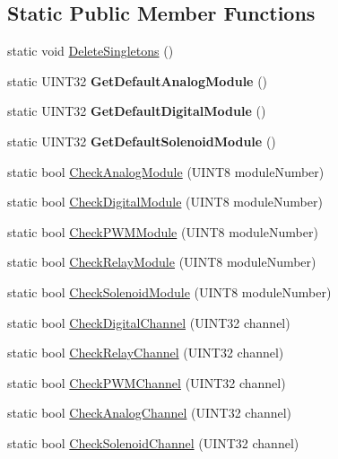 \subsection*{Static Public Member Functions}
\begin{DoxyCompactItemize}
\item 
static void \hyperlink{classSensorBase_aac521c8617e84c41c3e7c921302cdcc6}{DeleteSingletons} ()
\item 
\hypertarget{classSensorBase_ac4b2b62295f1b7e43124c63340c2957b}{
static UINT32 {\bfseries GetDefaultAnalogModule} ()}
\label{classSensorBase_ac4b2b62295f1b7e43124c63340c2957b}

\item 
\hypertarget{classSensorBase_a58b76ce72e9d70bf88b613b9f979a555}{
static UINT32 {\bfseries GetDefaultDigitalModule} ()}
\label{classSensorBase_a58b76ce72e9d70bf88b613b9f979a555}

\item 
\hypertarget{classSensorBase_a75c14f39c43663aca647876cece69fa0}{
static UINT32 {\bfseries GetDefaultSolenoidModule} ()}
\label{classSensorBase_a75c14f39c43663aca647876cece69fa0}

\item 
static bool \hyperlink{classSensorBase_a010ca97e0517a7dcaaf81b3d60c7c409}{CheckAnalogModule} (UINT8 moduleNumber)
\item 
static bool \hyperlink{classSensorBase_a4a80dc8b3693bb5720f03f06e05cd0bc}{CheckDigitalModule} (UINT8 moduleNumber)
\item 
static bool \hyperlink{classSensorBase_a273815e624f63a1ec6817a6b734832b5}{CheckPWMModule} (UINT8 moduleNumber)
\item 
static bool \hyperlink{classSensorBase_aa720a37953f69dd8a742e3707cbbb8ac}{CheckRelayModule} (UINT8 moduleNumber)
\item 
static bool \hyperlink{classSensorBase_a93b945da6cc5fc0e8eca68bf2749ff65}{CheckSolenoidModule} (UINT8 moduleNumber)
\item 
static bool \hyperlink{classSensorBase_a6b38ec81d351403492b0449dd4615e12}{CheckDigitalChannel} (UINT32 channel)
\item 
static bool \hyperlink{classSensorBase_af83a99ec4a84a9265a5a077d200c6275}{CheckRelayChannel} (UINT32 channel)
\item 
static bool \hyperlink{classSensorBase_ac4319058432968761cd72470b82644ae}{CheckPWMChannel} (UINT32 channel)
\item 
static bool \hyperlink{classSensorBase_a8c15101dc7a785d81eafa22644cdd02e}{CheckAnalogChannel} (UINT32 channel)
\item 
static bool \hyperlink{classSensorBase_a41deb3044c6a075226fa6e4840265b92}{CheckSolenoidChannel} (UINT32 channel)
\end{DoxyCompactItemize}
